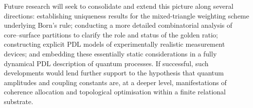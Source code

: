 \documentclass[11pt,a4paper]{article}
\numberwithin{equation}{section}
\begin{document}
Future research will seek to consolidate and extend this picture along several directions: establishing uniqueness results for the mixed-triangle weighting scheme underlying Born’s rule; conducting a more detailed combinatorial analysis of core–surface partitions to clarify the role and status of the golden ratio; constructing explicit PDL models of experimentally realistic measurement devices; and embedding these essentially static considerations in a fully dynamical PDL description of quantum processes. If successful, such developments would lend further support to the hypothesis that quantum amplitudes and coupling constants are, at a deeper level, manifestations of coherence allocation and topological optimisation within a finite relational substrate.

 

\end{document}
